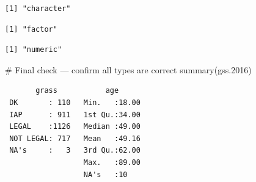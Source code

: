 \documentclass[
  letterpaper,
  DIV=11,
  numbers=noendperiod]{scrreprt}
\newenvironment{Shaded}{\begin{snugshade}}{\end{snugshade}}
\newcommand{\AttributeTok}[1]{\textcolor[rgb]{0.40,0.45,0.13}{#1}}
\newcommand{\CommentTok}[1]{\textcolor[rgb]{0.37,0.37,0.37}{#1}}
\newcommand{\DocumentationTok}[1]{\textcolor[rgb]{0.37,0.37,0.37}{\textit{#1}}}
\newcommand{\FloatTok}[1]{\textcolor[rgb]{0.68,0.00,0.00}{#1}}
\newcommand{\FunctionTok}[1]{\textcolor[rgb]{0.28,0.35,0.67}{#1}}
\newcommand{\NormalTok}[1]{\textcolor[rgb]{0.00,0.23,0.31}{#1}}
\newcommand{\OtherTok}[1]{\textcolor[rgb]{0.00,0.23,0.31}{#1}}
\newcommand{\SpecialCharTok}[1]{\textcolor[rgb]{0.37,0.37,0.37}{#1}}
\newcommand{\StringTok}[1]{\textcolor[rgb]{0.13,0.47,0.30}{#1}}
\begin{document}
\begin{verbatim}
[1] "character"
\end{verbatim}

\begin{Shaded}
\end{Shaded}

\begin{verbatim}
[1] "factor"
\end{verbatim}

\begin{Shaded}
\end{Shaded}

\begin{verbatim}
[1] "numeric"
\end{verbatim}

\begin{Shaded}
\begin{Highlighting}[]
\CommentTok{\# Final check — confirm all types are correct}
\FunctionTok{summary}\NormalTok{(gss}\FloatTok{.2016}\NormalTok{)}
\end{Highlighting}
\end{Shaded}

\begin{verbatim}
       grass           age       
 DK       : 110   Min.   :18.00  
 IAP      : 911   1st Qu.:34.00  
 LEGAL    :1126   Median :49.00  
 NOT LEGAL: 717   Mean   :49.16  
 NA's     :   3   3rd Qu.:62.00  
                  Max.   :89.00  
                  NA's   :10     
\end{verbatim}
\end{document}
